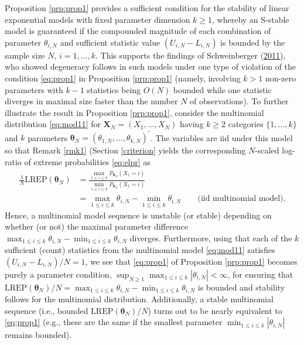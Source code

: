 \documentclass[12pt]{article}
\theoremstyle{definition}
\newcommand{\REP}{\mathrm{LREP}}
\begin{document}
Proposition \ref{prp:prop1} provides a sufficient condition for the
stability of linear exponential models with fixed parameter dimension
\(k\geq 1\), whereby an S-stable model is guaranteed if the compounded
magnitude of each combination of parameter \(\theta_{i,N}\) and
sufficient statistic value \((U_{i,N}-L_{i,N})\) is bounded by the
sample size \(N\), \(i=1,\ldots,k\). This supports the findings of
Schweinberger
(\protect\hyperlink{ref-schweinberger2011instability}{2011}), who showed
degeneracy follows in such models under one type of violation of the
condition \eqref{eq:prop1} in Proposition \ref{prp:prop1} (namely,
involving \(k>1\) non-zero parameters with \(k-1\) statistics being
\(O(N)\) bounded while one statistic diverges in maximal size faster
than the number \(N\) of observations). To further illustrate the result
in Proposition \ref{prp:prop1}, consider the multinomial distribution
\eqref{eq:mod11} for \(\boldsymbol X_N=(X_1,\ldots,X_N)\) having
\(k\geq 2\) categories \(\{1,\ldots,k\}\) and \(k\) parameters
\(\boldsymbol \theta_N = (\theta_{1,N},\ldots,\theta_{k,N})^\prime\).
The variables are iid under this model so that Remark \ref{rmk1}
(Section \ref{criterion} yields the corresponding \(N\)-scaled log-ratio
of extreme probabilities \eqref{eq:elpr} as
\begin{align*}
  \frac{1}{N}\REP(\boldsymbol \theta_N) &= \frac{\max_{1 \leq i \leq k} P_{\boldsymbol \theta_N}(X_1=i)}{\min_{1 \leq i \leq k} P_{\boldsymbol \theta_N}(X_1=i)}\\
  &= \max_{1 \leq i \leq k} \theta_{i,N} - \min_{1 \leq i \leq k} \theta_{i,N} \qquad \mbox{(iid multinomial model)}.
\end{align*}
Hence, a multinomial model sequence is unstable (or stable) depending on
whether (or not) the maximal parameter difference
\(\max_{1 \leq i \leq k} \theta_{i,N} - \min_{1 \leq i \leq k} \theta_{i,N}\)
diverges. Furthermore, using that each of the \(k\) sufficient (count)
statistics from the multinomial model \eqref{eq:mod11} satisfies
\((U_{i,N}-L_{i,N})/N=1\), we see that \eqref{eq:prop1} of Proposition
\ref{prp:prop1} becomes purely a parameter condition,
\(\sup_{N \geq 1}\max_{1 \leq i \leq k } |\theta_{i,N}| <\infty\), for
ensuring that
\(\REP(\boldsymbol \theta_N)/N =\max_{1 \leq i \leq k} \theta_{i,N} - \min_{1 \leq i \leq k} \theta_{i,N}\)
is bounded and stability follows for the multinomial distribution.
Additionally, a stable multinomial sequence (i.e., bounded
\(\REP(\boldsymbol \theta_N)/N\)) turns out to be nearly equivalent to
\eqref{eq:prop1} (e.g., these are the same if the smallest parameter
\(\min_{1 \leq i \leq k } |\theta_{i,N}|\) remains bounded).
\end{document}
